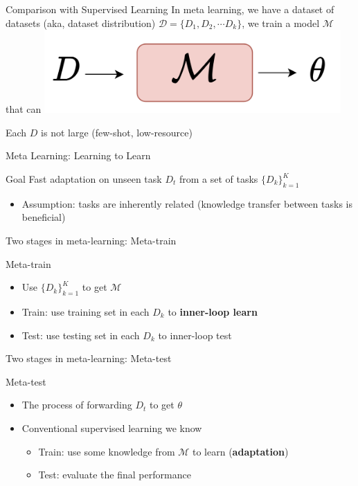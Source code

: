 \documentclass{beamer}
\begin{document}
\begin{frame}[t]{Comparison with Supervised Learning}
  In meta learning, we have a dataset of datasets (aka, dataset distribution) $\mathcal{D} = \lbrace D_1, D_2, \cdots D_k \rbrace$, we train a model $\mathcal{M}$ that can
  \center \includegraphics[width=0.85\textwidth]{fig/meta_learning.png}

  Each $D$ is not large (few-shot, low-resource)
\end{frame}

\begin{frame}[t]{Meta Learning: Learning to Learn}
  \begin{block}{Goal}
    Fast adaptation on unseen task $D_t$ from a set of tasks $\{ D_k\}^{K}_{k=1}$ 
  \end{block}
  \pause 

  \begin{itemize}
    \item Assumption: tasks are inherently related (knowledge transfer between tasks is beneficial)
  \end{itemize}
\end{frame}

\begin{frame}[t]{Two stages in meta-learning: Meta-train}
  \begin{block}{Meta-train}
    \begin{itemize}
      \item Use $\{ D_k \}^{K}_{k=1}$ to get $\mathcal{M}$
      \item Train: use training set in each $D_k$ to \textbf{inner-loop learn}
      \item Test: use testing set in each $D_k$ to inner-loop test
    \end{itemize}
  \end{block}
\end{frame}

\begin{frame}[t]{Two stages in meta-learning: Meta-test}
  \begin{block}{Meta-test}
    \begin{itemize}
      \item The process of forwarding $D_t$ to get $\theta$
      \item Conventional supervised learning we know
      \begin{itemize}
        \item Train: use some knowledge from $\mathcal{M}$ to learn (\textbf{adaptation})
        \item Test: evaluate the final performance
      \end{itemize}
    \end{itemize}
  \end{block}
\end{frame}
\end{document}

